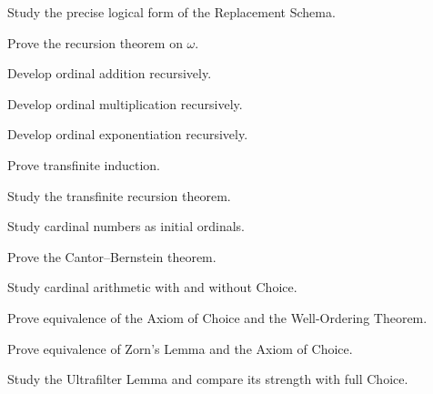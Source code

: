 \begin{exercise}[4]
Study the precise logical form of the Replacement Schema.
\end{exercise}

\begin{exercise}[4]
Prove the recursion theorem on \(\omega\).
\end{exercise}

\begin{exercise}[4]
Develop ordinal addition recursively.
\end{exercise}

\begin{exercise}[4]
Develop ordinal multiplication recursively.
\end{exercise}

\begin{exercise}[4]
Develop ordinal exponentiation recursively.
\end{exercise}

\begin{exercise}[4]
Prove transfinite induction.
\end{exercise}

\begin{exercise}[4]
Study the transfinite recursion theorem.
\end{exercise}

\begin{exercise}[4]
Study cardinal numbers as initial ordinals.
\end{exercise}

\begin{exercise}[4]
Prove the Cantor--Bernstein theorem.
\end{exercise}

\begin{exercise}[4]
Study cardinal arithmetic with and without Choice.
\end{exercise}

\begin{exercise}[4]
Prove equivalence of the Axiom of Choice and the Well-Ordering Theorem.
\end{exercise}

\begin{exercise}[4]
Prove equivalence of Zorn's Lemma and the Axiom of Choice.
\end{exercise}

\begin{exercise}[4]
Study the Ultrafilter Lemma and compare its strength with full Choice.
\end{exercise}

